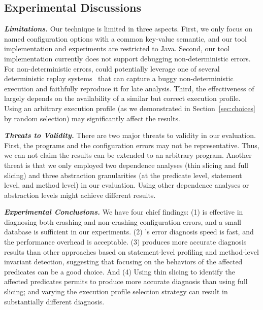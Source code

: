 \subsection{Experimental Discussions}


\noindent \textbf{\textit{Limitations.}} 
Our technique is limited in three aspects.
First, we only focus on named configuration options
with a common key-value semantic, and our tool implementation
and experiments are
restricted to Java. 
Second,  our tool implementation currently does not
support debugging non-deterministic errors. 
For non-deterministic errors, \ourtool could potentially leverage one of
several deterministic replay systems~\cite{Huang:2010:LLD}
that can capture a buggy non-deterministic
execution and faithfully reproduce it for late analysis.
Third, the effectiveness of \ourtool largely
depends on the availability of a similar but correct execution profile.
Using an arbitrary execution profile (as we demonstrated in Section~\ref{sec:choices}
by random selection) may significantly affect the results.

\vspace{1mm}

\noindent \textbf{\textit{Threats to Validity.}} 
There are two major threats to validity in our evaluation. 
First, the \subjectnum programs and the configuration errors may not be
representative. Thus, we can not claim the results can be
extended to an arbitrary program.
Another threat is that we only employed two dependence
analyses (thin slicing and full slicing) and three
abstraction granularities (at the predicate level,
statement level, and method level) in our evaluation.
 Using other dependence analyses or abstraction levels
might achieve different results.



\vspace{1mm}

\noindent \textbf{\textit{Experimental Conclusions.}} 
We have four chief findings: (1) \ourtool is effective
in diagnosing both crashing and non-crashing configuration errors,
and a small database is sufficient in our experiments.
(2) \ourtool's error diagnosis speed is fast, and the performance
overhead is acceptable.
(3) \ourtool produces more accurate diagnosis results than other
approaches based on statement-level profiling and method-level
invariant detection, suggesting that focusing on the behaviors
of the affected predicates can be a good choice.
And (4) Using thin slicing to identify the affected predicates
permits \ourtool to produce more accurate diagnosis than using
full slicing; and varying the execution profile selection
strategy can result in substantially different diagnosis.





